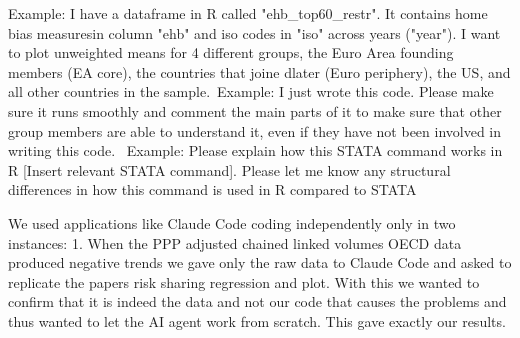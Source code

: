 \documentclass{article}
\begin{document}
    Example:
        I have a dataframe in R called "ehb_top60_restr". It contains home bias measuresin column "ehb" and iso codes in "iso" across years ("year").
        I want to plot unweighted means for 4 different groups, the Euro Area founding members (EA core), the countries that joine dlater (Euro periphery), 
        the US, and all other countries in the sample.\
    Example:
        I just wrote this code. Please make sure it runs smoothly and comment the main parts of it to make sure that other group members are able to understand it, even if 
        they have not been involved in writing this code. \
    Example: 
        Please explain how this STATA command works in R [Insert relevant STATA command]. Please let me know any structural differences in how this command is used in R compared to STATA

    We used applications like Claude Code coding independently only in two instances:
        1. When the PPP adjusted chained linked volumes OECD data produced negative trends we gave only the raw data to Claude Code and asked to replicate the papers risk sharing regression and plot.
        With this we wanted to confirm that it is indeed the data and not our code that causes the problems and thus wanted to let the AI agent work from scratch.
        This gave exactly our results.
\end{document}
